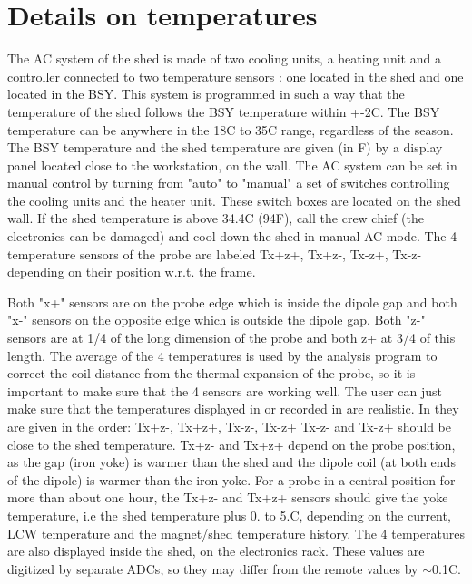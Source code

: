 {\section{Details on temperatures }

The AC system of the shed is made of two cooling units, a heating unit and a
controller connected to two temperature sensors : one located in the shed and
one located in the BSY. This system is programmed in such a way that the 
temperature
of the shed follows the BSY temperature within +-2C. The BSY temperature can
be anywhere in the 18C to 35C range, regardless of the season. The BSY 
temperature
and the shed temperature are given (in F) by a display panel located close to
the workstation, on the wall. The AC system can be set in manual control by
turning from "auto" to "manual" a set of
switches controlling the cooling units and the heater unit. These switch boxes
are located on the shed wall. If the shed temperature is above 34.4C (94F),
call the crew chief (the electronics can be damaged) and cool down the shed in manual
AC mode. The 4 temperature sensors of the probe are labeled Tx+z+, Tx+z-, Tx-z+,
Tx-z- depending on their position w.r.t. the frame. 

Both "x+" sensors are on the probe edge which is inside the
dipole gap and both "x-" sensors on the opposite edge which
is outside the dipole gap. Both "z-" sensors are at 1/4 of
the long dimension of the probe and both z+ at 3/4 of this length. The average
of the 4 temperatures is used by the analysis program to correct the coil distance
from the thermal expansion of the probe, so it is important to make sure that
the 4 sensors are working well. The user can just make sure that the temperatures
displayed in  or recorded in 
are realistic. In  they are given in the
order: Tx+z-, Tx+z+, Tx-z-, Tx-z+ Tx-z- and Tx-z+ should be close to the shed
temperature. Tx+z- and Tx+z+ depend on the probe position, as the gap (iron
yoke) is warmer than the shed and the dipole coil (at both ends of the dipole)
is warmer than the iron yoke. For a probe in a central position for more than
about one hour, the Tx+z- and Tx+z+ sensors should give the yoke temperature,
i.e the shed temperature plus 0. to 5.C, depending on the current, LCW temperature
and the magnet/shed temperature history. The 4 temperatures are also displayed
inside the shed, on the electronics rack. These values are digitized by separate
ADCs, so they may differ from the remote values by \( \sim  \)0.1C. 
}

